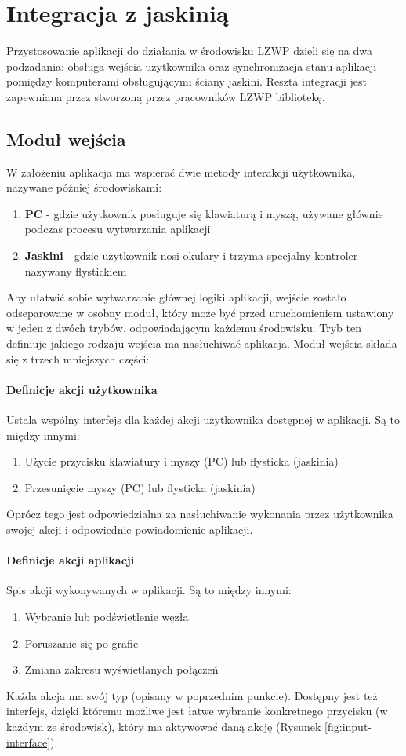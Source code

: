 \section{Integracja z jaskinią}
Przystosowanie aplikacji do działania w środowisku LZWP dzieli się na dwa podzadania: obsługa wejścia użytkownika oraz synchronizacja stanu aplikacji pomiędzy komputerami obsługującymi ściany jaskini. Reszta integracji jest zapewniana przez stworzoną przez pracowników LZWP bibliotekę.

\subsection{Moduł wejścia}
W założeniu aplikacja ma wspierać dwie metody interakcji użytkownika, nazywane później środowiskami:
\begin{enumerate}[label=\textbullet]
	\item \textbf{PC} - gdzie użytkownik posługuje się klawiaturą i myszą, używane głównie podczas procesu wytwarzania aplikacji
	\item \textbf{Jaskini} - gdzie użytkownik nosi okulary i trzyma specjalny kontroler nazywany flystickiem
\end{enumerate}
Aby ułatwić sobie wytwarzanie głównej logiki aplikacji, wejście zostało odseparowane w osobny moduł, który może być przed uruchomieniem ustawiony w jeden z dwóch trybów, odpowiadającym każdemu środowisku. Tryb ten definiuje jakiego rodzaju wejścia ma nasłuchiwać aplikacja. Moduł wejścia składa się z trzech mniejszych części:
\paragraph{Definicje akcji użytkownika}
Ustala wspólny interfejs dla każdej akcji użytkownika dostępnej w aplikacji. Są to między innymi: 
\begin{enumerate}[label=\textbullet]
	\item Użycie przycisku klawiatury i myszy (PC) lub flysticka (jaskinia)
	\item Przesunięcie myszy (PC) lub flysticka (jaskinia)
\end{enumerate}
Oprócz tego jest odpowiedzialna za nasłuchiwanie wykonania przez użytkownika swojej akcji i odpowiednie powiadomienie aplikacji.

\paragraph{Definicje akcji aplikacji}
Spis akcji wykonywanych w aplikacji. Są to między innymi: 
\begin{enumerate}[label=\textbullet]
	\item Wybranie lub podświetlenie węzła
	\item Poruszanie się po grafie
	\item Zmiana zakresu wyświetlanych połączeń
\end{enumerate}
Każda akcja ma swój typ (opisany w poprzednim punkcie). Dostępny jest też interfejs, dzięki któremu możliwe jest łatwe wybranie konkretnego przycisku (w każdym ze środowisk), który ma aktywować daną akcję (Rysunek \ref{fig:input-interface}).

